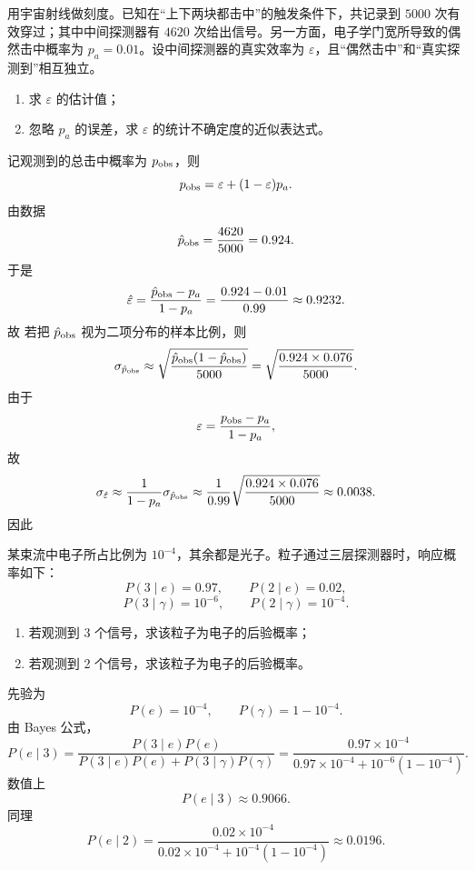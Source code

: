 \begin{question}
用宇宙射线做刻度。已知在“上下两块都击中”的触发条件下，共记录到 $5000$ 次有效穿过；其中中间探测器有 $4620$ 次给出信号。另一方面，电子学门宽所导致的偶然击中概率为 $p_a=0.01$。设中间探测器的真实效率为 $\varepsilon$，且“偶然击中”和“真实探测到”相互独立。
\begin{enumerate}
\item 求 $\varepsilon$ 的估计值；
\item 忽略 $p_a$ 的误差，求 $\varepsilon$ 的统计不确定度的近似表达式。
\end{enumerate}
\begin{solution}
记观测到的总击中概率为 $p_{\rm obs}$，则
\[
p_{\rm obs}=\varepsilon+(1-\varepsilon)p_a.
\]
由数据
\[
\hat p_{\rm obs}=\frac{4620}{5000}=0.924.
\]
于是
\[
\hat\varepsilon=\frac{\hat p_{\rm obs}-p_a}{1-p_a}
=\frac{0.924-0.01}{0.99}
\approx 0.9232.
\]
故
若把 $\hat p_{\rm obs}$ 视为二项分布的样本比例，则
\[
\sigma_{\hat p_{\rm obs}}\approx \sqrt{\frac{\hat p_{\rm obs}(1-\hat p_{\rm obs})}{5000}}
=\sqrt{\frac{0.924\times 0.076}{5000}}.
\]
由于
\[
\varepsilon=\frac{p_{\rm obs}-p_a}{1-p_a},
\]
故
\[
\sigma_{\hat\varepsilon}\approx \frac{1}{1-p_a}\sigma_{\hat p_{\rm obs}}
\approx \frac{1}{0.99}\sqrt{\frac{0.924\times 0.076}{5000}}
\approx 0.0038.
\]
因此
\end{solution}
\end{question}

\begin{question}
某束流中电子所占比例为 $10^{-4}$，其余都是光子。粒子通过三层探测器时，响应概率如下：
\[
P(3\mid e)=0.97,\qquad P(2\mid e)=0.02,
\]
\[
P(3\mid \gamma)=10^{-6},\qquad P(2\mid \gamma)=10^{-4}.
\]
\begin{enumerate}
\item 若观测到 3 个信号，求该粒子为电子的后验概率；
\item 若观测到 2 个信号，求该粒子为电子的后验概率。
\end{enumerate}
\begin{solution}
先验为
\[
P(e)=10^{-4},\qquad P(\gamma)=1-10^{-4}.
\]
由 Bayes 公式，
\[
P(e\mid 3)=\frac{P(3\mid e)P(e)}{P(3\mid e)P(e)+P(3\mid \gamma)P(\gamma)}
=\frac{0.97\times 10^{-4}}{0.97\times 10^{-4}+10^{-6}(1-10^{-4})}.
\]
数值上
\[
P(e\mid 3)\approx 0.9066.
\]
同理
\[
P(e\mid 2)=\frac{0.02\times 10^{-4}}{0.02\times 10^{-4}+10^{-4}(1-10^{-4})}
\approx 0.0196.
\]
\end{solution}
\end{question}

